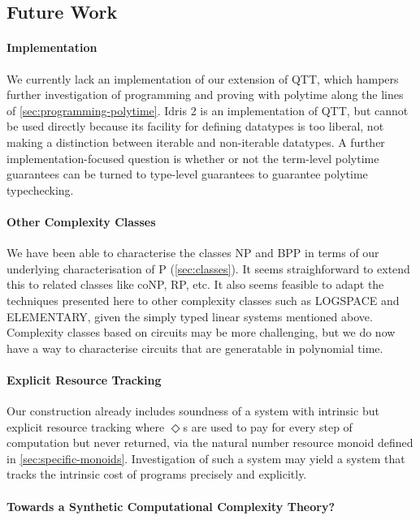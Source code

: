 \documentclass[acmsmall,screen]{acmart}
\begin{document}
\subsection{Future Work}
\label{sec:towards-synthetic-complexity-theory}

\paragraph{Implementation} We currently lack an implementation of our
extension of QTT, which hampers further investigation of programming
and proving with polytime along the lines of
\autoref{sec:programming-polytime}. Idris 2 \cite{Brady21} is an
implementation of QTT, but cannot be used directly because its facility
for defining datatypes is too liberal, not making a distinction
between iterable and non-iterable datatypes. A further
implementation-focused question is whether or not the term-level
polytime guarantees can be turned to type-level guarantees to
guarantee polytime typechecking.

\paragraph{Other Complexity Classes}
We have been able to characterise the classes NP and BPP in terms of
our underlying characterisation of P (\autoref{sec:classes}). It seems
straighforward to extend this to related classes like coNP, RP,
etc. It also seems feasible to adapt the techniques presented here to
other complexity classes such as LOGSPACE and ELEMENTARY, given the
simply typed linear systems mentioned above. Complexity classes based
on circuits may be more challenging, but we do now have a way to
characterise circuits that are generatable in polynomial
time.

\paragraph{Explicit Resource Tracking}
Our construction already includes soundness of a system with intrinsic
but explicit resource tracking where $\Diamond$s are used to pay for
every step of computation but never returned, via the natural number
resource monoid defined in
\autoref{sec:specific-monoids}. Investigation of such a system may
yield a system that tracks the intrinsic cost of programs precisely
and explicitly.

\paragraph{Towards a Synthetic Computational Complexity Theory?}
\end{document}
